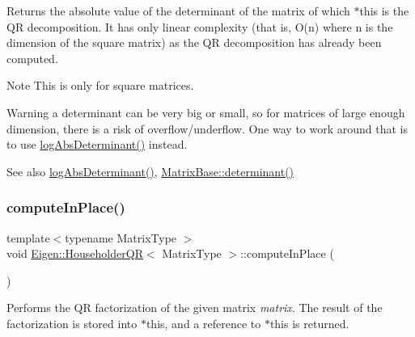 \begin{DoxyReturn}{Returns}
the absolute value of the determinant of the matrix of which $\ast$this is the QR decomposition. It has only linear complexity (that is, O(n) where n is the dimension of the square matrix) as the QR decomposition has already been computed.
\end{DoxyReturn}
\begin{DoxyNote}{Note}
This is only for square matrices.
\end{DoxyNote}
\begin{DoxyWarning}{Warning}
a determinant can be very big or small, so for matrices of large enough dimension, there is a risk of overflow/underflow. One way to work around that is to use \mbox{\hyperlink{class_eigen_1_1_householder_q_r_af61b6dbef34fc51c825182b16dc43ca1}{log\+Abs\+Determinant()}} instead.
\end{DoxyWarning}
\begin{DoxySeeAlso}{See also}
\mbox{\hyperlink{class_eigen_1_1_householder_q_r_af61b6dbef34fc51c825182b16dc43ca1}{log\+Abs\+Determinant()}}, \mbox{\hyperlink{class_eigen_1_1_matrix_base_a7ad8f77004bb956b603bb43fd2e3c061}{Matrix\+Base\+::determinant()}} 
\end{DoxySeeAlso}
\mbox{\label{class_eigen_1_1_householder_q_r_a3a16530338a734971fc45efb0ef9ac94}} 
\subsubsection{\texorpdfstring{computeInPlace()}{computeInPlace()}}
{\footnotesize\ttfamily template$<$typename Matrix\+Type $>$ \\
void \mbox{\hyperlink{class_eigen_1_1_householder_q_r}{Eigen\+::\+Householder\+QR}}$<$ Matrix\+Type $>$\+::compute\+In\+Place (\begin{DoxyParamCaption}{ }\end{DoxyParamCaption})\hspace{0.3cm}{\ttfamily [protected]}}

Performs the QR factorization of the given matrix {\itshape matrix}. The result of the factorization is stored into {\ttfamily $\ast$this}, and a reference to {\ttfamily $\ast$this} is returned.

